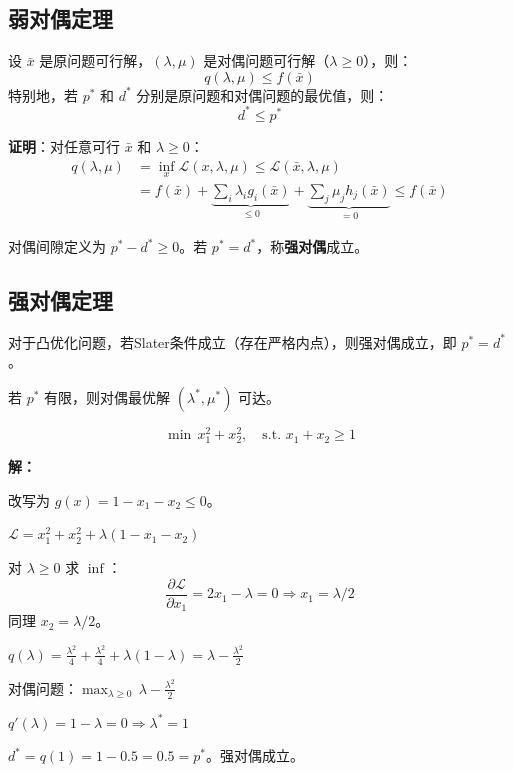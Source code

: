 \subsection{弱对偶定理}

\begin{theorem}[弱对偶定理]
设 $\bar{x}$ 是原问题可行解，$(\lambda, \mu)$ 是对偶问题可行解（$\lambda \geq 0$），则：
\[
q(\lambda, \mu) \leq f(\bar{x})
\]
特别地，若 $p^*$ 和 $d^*$ 分别是原问题和对偶问题的最优值，则：
\[
d^* \leq p^*
\]
\end{theorem}

\textbf{证明}：对任意可行 $\bar{x}$ 和 $\lambda \geq 0$：
\begin{align*}
q(\lambda, \mu) &= \inf_x \mathcal{L}(x, \lambda, \mu) \leq \mathcal{L}(\bar{x}, \lambda, \mu) \\
&= f(\bar{x}) + \underbrace{\sum_i \lambda_i g_i(\bar{x})}_{\leq 0} + \underbrace{\sum_j \mu_j h_j(\bar{x})}_{= 0} \leq f(\bar{x})
\end{align*}

\begin{definition}[对偶间隙]
对偶间隙定义为 $p^* - d^* \geq 0$。若 $p^* = d^*$，称\textbf{强对偶}成立。
\end{definition}

\subsection{强对偶定理}

\begin{theorem}[强对偶定理]
对于凸优化问题，若Slater条件成立（存在严格内点），则强对偶成立，即 $p^* = d^*$。

若 $p^*$ 有限，则对偶最优解 $(\lambda^*, \mu^*)$ 可达。
\end{theorem}

\begin{example}[强对偶成立]
\[
\min \, x_1^2 + x_2^2, \quad \text{s.t. } x_1 + x_2 \geq 1
\]

\textbf{解：}

改写为 $g(x) = 1 - x_1 - x_2 \leq 0$。

$\mathcal{L} = x_1^2 + x_2^2 + \lambda(1 - x_1 - x_2)$

对 $\lambda \geq 0$ 求 $\inf$：
\[
\frac{\partial \mathcal{L}}{\partial x_1} = 2x_1 - \lambda = 0 \Rightarrow x_1 = \lambda/2
\]
同理 $x_2 = \lambda/2$。

$q(\lambda) = \frac{\lambda^2}{4} + \frac{\lambda^2}{4} + \lambda(1 - \lambda) = \lambda - \frac{\lambda^2}{2}$

对偶问题：$\max_{\lambda \geq 0} \, \lambda - \frac{\lambda^2}{2}$

$q'(\lambda) = 1 - \lambda = 0 \Rightarrow \lambda^* = 1$

$d^* = q(1) = 1 - 0.5 = 0.5 = p^*$。强对偶成立。
\end{example}

